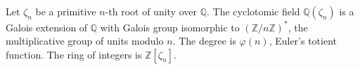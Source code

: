 Let $\zeta_n$ be a primitive $n$-th root of unity over $\mathbb{Q}$. The cyclotomic field $\mathbb{Q}(\zeta_n)$ is a Galois extension of $\mathbb{Q}$ with Galois group isomorphic to $(\mathbb{Z}/n\mathbb{Z})^*$, the multiplicative group of units modulo $n$. The degree is $\varphi(n)$, Euler's totient function. The ring of integers is $\mathbb{Z}[\zeta_n]$.
